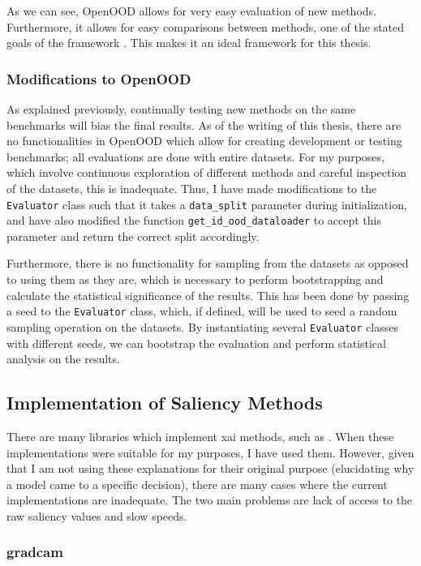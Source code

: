 \documentclass[UKenglish]{uiomasterthesis} %
\theoremstyle{definition}
\begin{document}
As we can see, OpenOOD allows for very easy evaluation of new methods. Furthermore, it allows for easy comparisons between methods, one of the stated goals of the framework \cite{openood}. This makes it an ideal framework for this thesis.


\subsubsection{Modifications to OpenOOD}

As explained previously, continually testing new methods on the same benchmarks will bias the final results. As of the writing of this thesis, there are no functionalities in OpenOOD which allow for creating development or testing benchmarks; all evaluations are done with entire datasets. For my purposes, which involve continuous exploration of different methods and careful inspection of the datasets, this is inadequate. Thus, I have made modifications to the \texttt{Evaluator} class such that it takes a \texttt{data\_split} parameter during initialization, and have also modified the function \texttt{get\_id\_ood\_dataloader} to accept this parameter and return the correct split accordingly.

Furthermore, there is no functionality for sampling from the datasets as opposed to using them as they are, which is necessary to perform bootstrapping and calculate the statistical significance of the results. This has been done by passing a seed to the \texttt{Evaluator} class, which, if defined, will be used to seed a random sampling operation on the datasets. By instantiating several \texttt{Evaluator} classes with different seeds, we can bootstrap the evaluation and perform statistical analysis on the results.

\subsection{Implementation of Saliency Methods}

There are many libraries which implement \ac{xai} methods, such as \cite{lime, captum, jacobgilpytorchcam}. When these implementations were suitable for my purposes, I have used them. However, given that I am not using these explanations for their original purpose (elucidating why a model came to a specific decision), there are many cases where the current implementations are inadequate. The two main problems are lack of access to the raw saliency values and slow speeds.

\subsubsection{\ac{gradcam}}
\end{document}
